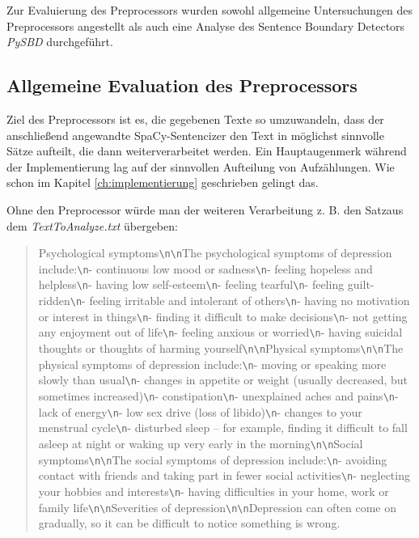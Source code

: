 Zur Evaluierung des Preprocessors wurden sowohl allgemeine Untersuchungen des Preprocessors angestellt als auch eine Analyse des Sentence Boundary Detectors \emph{PySBD} durchgeführt.

\subsection{Allgemeine Evaluation des Preprocessors}
\label{sec:evaluation_preprocessor}

Ziel des Preprocessors ist es, die gegebenen Texte so umzuwandeln, dass der anschließend angewandte SpaCy-Sentencizer den Text in möglichst sinnvolle Sätze aufteilt, die dann weiterverarbeitet werden. Ein Hauptaugenmerk während der Implementierung lag auf der sinnvollen Aufteilung von Aufzählungen. Wie schon im Kapitel \ref{ch:implementierung} geschrieben gelingt das.

Ohne den Preprocessor würde man der weiteren Verarbeitung z. B. den \glqq Satz\grqq aus dem \emph{TextToAnalyze.txt} übergeben:

\begin{quotation}
	\glqq Psychological symptoms\verb!\n!\verb!\n!The psychological symptoms of depression include:\verb!\n!- continuous low mood or sadness\verb!\n!- feeling hopeless and helpless\verb!\n!- having low self-esteem\verb!\n!- feeling tearful\verb!\n!- feeling guilt-ridden\verb!\n!- feeling irritable and intolerant of others\verb!\n!- having no motivation or interest in things\verb!\n!- finding it difficult to make decisions\verb!\n!- not getting any enjoyment out of life\verb!\n!- feeling anxious or worried\verb!\n!- having suicidal thoughts or thoughts of harming yourself\verb!\n!\verb!\n!Physical symptoms\verb!\n!\verb!\n!The physical symptoms of depression include:\verb!\n!- moving or speaking more slowly than usual\verb!\n!- changes in appetite or weight (usually decreased, but sometimes increased)\verb!\n!- constipation\verb!\n!- unexplained aches and pains\verb!\n!- lack of energy\verb!\n!- low sex drive (loss of libido)\verb!\n!- changes to your menstrual cycle\verb!\n!- disturbed sleep – for example, finding it difficult to fall asleep at night or waking up very early in the morning\verb!\n!\verb!\n!Social symptoms\verb!\n!\verb!\n!The social symptoms of depression include:\verb!\n!- avoiding contact with friends and taking part in fewer social activities\verb!\n!- neglecting your hobbies and interests\verb!\n!- having difficulties in your home, work or family life\verb!\n!\verb!\n!Severities of depression\verb!\n!\verb!\n!Depression can often come on gradually, so it can be difficult to notice something is wrong.\grqq
\end{quotation} 

